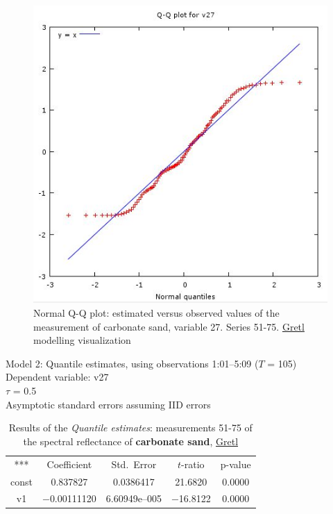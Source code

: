 \documentclass[10pt, a4paper]{article}
\begin{document}
\begin{appendices}
\begin{figure}[H]
	\begin{center}
		\includegraphics[scale=0.4]{G-QQplot-sand.jpg}
		\caption{Normal Q-Q plot: estimated versus observed values of the measurement of carbonate sand, variable 27. Series 51-75. \href{http://gretl.sourceforge.net/}{Gretl} modelling visualization­}
	\label{fig:61}
	\end{center}
\end{figure}

\begin{table}[H]
	\caption{Results of the \textit{Quantile estimates}: measurements 51-75 of the spectral reflectance of \textbf{carbonate sand}, \href{http://gretl.sourceforge.net/}{Gretl}}
	\begin{center}
		Model 2: Quantile estimates, using observations 1:01--5:09 ($T$ = 105)\\
		Dependent variable: v27\\
		$\tau$ = 0.5\\
		Asymptotic standard errors assuming IID errors\\

\vspace{1em}

\begin{tabular}{c c c c c}
	***   & {Coefficient} & {Std.\ Error} & {$t$-ratio} & {p-value} \\[1ex]
	const &  0.837827 &    0.0386417 &      21.6820 &         0.0000 \\
	v1 &   $-$0.00111120 &     6.60949\textrm{e--005} &       $-$16.8122 &         0.0000 \\ \hline \hline
\end{tabular}


\end{center}
\end{table}
\end{appendices}
\end{document}
